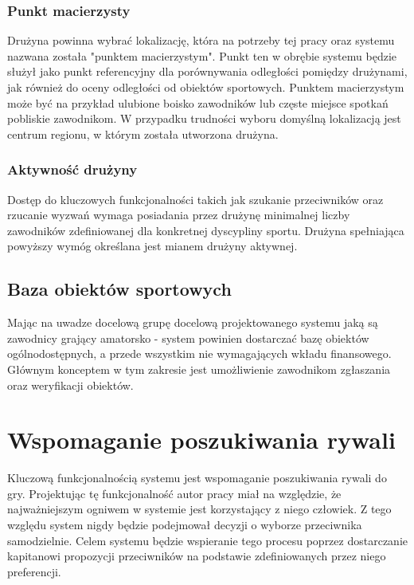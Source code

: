 \subsubsection{Punkt macierzysty}

Drużyna powinna wybrać lokalizację, która na potrzeby tej pracy oraz systemu nazwana została "punktem macierzystym". Punkt ten w obrębie systemu będzie służył jako punkt referencyjny dla porównywania odległości pomiędzy drużynami, jak również do oceny odległości od obiektów sportowych. Punktem macierzystym może być na przykład ulubione boisko zawodników lub częste miejsce spotkań pobliskie zawodnikom. W przypadku trudności wyboru domyślną lokalizacją jest centrum regionu, w którym została utworzona drużyna.

\subsubsection{Aktywność drużyny}

Dostęp do kluczowych funkcjonalności takich jak szukanie przeciwników oraz rzucanie wyzwań wymaga posiadania przez drużynę minimalnej liczby zawodników zdefiniowanej dla konkretnej dyscypliny sportu. Drużyna spełniająca powyższy wymóg określana jest mianem drużyny aktywnej.

\subsection{Baza obiektów sportowych}

Mając na uwadze docelową grupę docelową projektowanego systemu jaką są zawodnicy grający amatorsko - system powinien dostarczać bazę obiektów ogólnodostępnych, a przede wszystkim nie wymagających wkładu finansowego. Głównym konceptem w tym zakresie jest umożliwienie zawodnikom zgłaszania oraz weryfikacji obiektów. 

\section{Wspomaganie poszukiwania rywali}

Kluczową funkcjonalnością systemu jest wspomaganie poszukiwania rywali do gry. Projektując tę funkcjonalność autor pracy miał na względzie, że najważniejszym ogniwem w systemie jest korzystający z niego człowiek. Z tego względu system nigdy będzie podejmował decyzji o wyborze przeciwnika samodzielnie. Celem systemu będzie wspieranie tego procesu poprzez dostarczanie kapitanowi propozycji przeciwników na podstawie zdefiniowanych przez niego preferencji.


